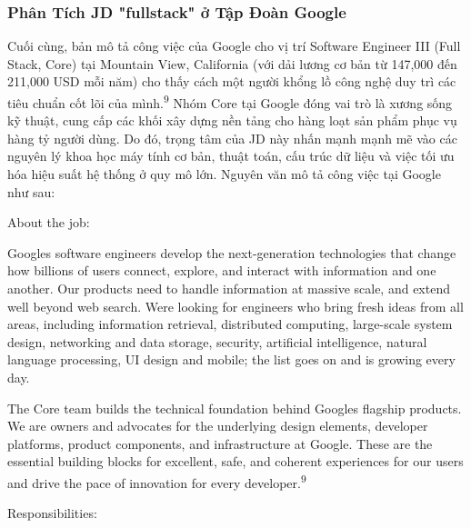 \documentclass[12pt,a4paper]{article}
\begin{document}
\subsubsection{Phân Tích JD "fullstack" ở Tập Đoàn Google}

Cuối cùng, bản mô tả công việc của Google cho vị trí Software Engineer III (Full Stack, Core) tại Mountain View, California (với dải lương cơ bản từ 147,000 đến 211,000 USD mỗi năm) cho thấy cách một người khổng lồ công nghệ duy trì các tiêu chuẩn cốt lõi của mình.\textsuperscript{9} Nhóm Core tại Google đóng vai trò là xương sống kỹ thuật, cung cấp các khối xây dựng nền tảng cho hàng loạt sản phẩm phục vụ hàng tỷ người dùng. Do đó, trọng tâm của JD này nhấn mạnh mạnh mẽ vào các nguyên lý khoa học máy tính cơ bản, thuật toán, cấu trúc dữ liệu và việc tối ưu hóa hiệu suất hệ thống ở quy mô lớn. Nguyên văn mô tả công việc tại Google như sau:

About the job:

Google\textquotesingle s software engineers develop the next-generation technologies that change how billions of users connect, explore, and interact with information and one another. Our products need to handle information at massive scale, and extend well beyond web search. We\textquotesingle re looking for engineers who bring fresh ideas from all areas, including information retrieval, distributed computing, large-scale system design, networking and data storage, security, artificial intelligence, natural language processing, UI design and mobile; the list goes on and is growing every day.

The Core team builds the technical foundation behind Google\textquotesingle s flagship products. We are owners and advocates for the underlying design elements, developer platforms, product components, and infrastructure at Google. These are the essential building blocks for excellent, safe, and coherent experiences for our users and drive the pace of innovation for every developer.\textsuperscript{9}

Responsibilities:
\end{document}

